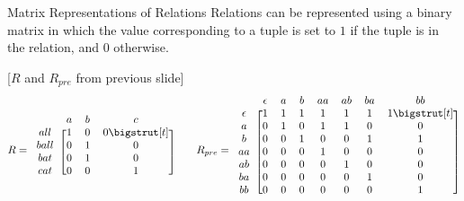 \documentclass[style=sailor,size=12pt]{powerdot}
\begin{document}
\begin{slide}[bm=,toc=]{Matrix Representations of Relations}
Relations can be represented using a binary matrix in which the
value corresponding to a tuple is set to $1$ if the tuple is
in the relation, and $0$ otherwise.
\begin{ex}{}[$R$ and $R_{pre}$ from previous slide]
\[
R = 
\begin{blockarray}{cccc}
\begin{block}{cccc}
& a & b & c \\
\end{block}
\begin{block}{c[ccc]}
all  & 1 & 0 & 0 \bigstrut[t] \\
ball & 0 & 1 & 0 \\
bat  & 0 & 1 & 0 \\
cat  & 0 & 0 & 1 \\
\end{block}
\end{blockarray}
\qquad R_{pre} =
\begin{blockarray}{cccccccc}
\begin{block}{cccccccc}
 & \epsilon & a & b & aa & ab & ba & bb \\
\end{block}
\begin{block}{c[ccccccc]}
\epsilon & 1  & 1 & 1 & 1  & 1  & 1  & 1\bigstrut[t] \\
a  & 0& 1 & 0 & 1  & 1  & 0  & 0 \\
b  & 0& 0 & 1 & 0  & 0  & 1  & 1 \\
aa & 0& 0 & 0 & 1  & 0  & 0  & 0 \\
ab & 0& 0 & 0 & 0  & 1  & 0  & 0 \\
ba & 0& 0 & 0 & 0  & 0  & 1  & 0 \\
bb & 0& 0 & 0 & 0  & 0  & 0  & 1 \\
\end{block}
\end{blockarray}
\]
\end{ex}
\end{slide}
\end{document}

